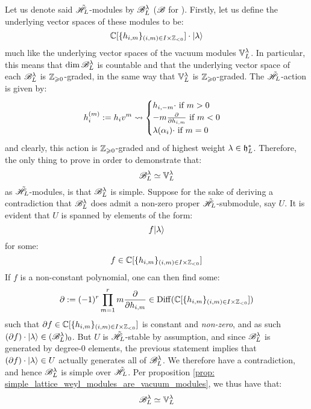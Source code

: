 \begin{example}
            Let us denote said $\tilde{\mathscr{H}}_L$-modules by $\mathscr{B}_L^{\lambda}$ ($\mathscr{B}$ for ). Firstly, let us define the underlying vector spaces of these modules to be:
                $$\bbC[ \{h_{i, m}\}_{(i, m) \in I \x \Z_{< 0}} ] \cdot \ket{\lambda}$$
            much like the underlying vector spaces of the vacuum modules $\mathbb{V}_L^{\lambda}$. In particular, this means that $\dim \mathscr{B}_L^{\lambda}$ is countable and that the underlying vector space of each $\mathscr{B}_L^{\lambda}$ is $\mathbb{Z}_{\geqslant 0}$-graded, in the same way that $\mathbb{V}_L^{\lambda}$ is $\mathbb{Z}_{\geqslant 0}$-graded. The $\tilde{\mathscr{H}}_L$-action is given by:
                $$
                    h_i^{(m)} := h_i v^m \leadsto
                    \begin{cases}
                        \text{$h_{i, -m} \cdot$ if $m > 0$}
                        \\
                        \text{$-m \frac{\partial}{\partial h_{i, m}}$ if $m < 0$}
                        \\
                        \text{$\lambda(\alpha_i) \cdot$ if $m = 0$}
                    \end{cases}
                $$
            and clearly, this action is $\mathbb{Z}_{\geqslant 0}$-graded and of highest weight $\lambda \in \mathfrak{h}_L^*$. Therefore, the only thing to prove in order to demonstrate that:
                $$\mathscr{B}_L^{\lambda} \simeq \mathbb{V}_L^{\lambda}$$
            as $\tilde{\mathscr{H}}_L$-modules, is that $\mathscr{B}_L^{\lambda}$ is simple. Suppose for the sake of deriving a contradiction that $\mathscr{B}_L^{\lambda}$ does admit a non-zero proper $\tilde{\mathscr{H}}_L$-submodule, say $U$. It is evident that $U$ is spanned by elements of the form:
                $$f \lvert {\lambda} \rangle$$
            for some:
                $$f \in \bbC[ \{h_{i, m}\}_{(i, m) \in I \x \Z_{< 0}} ]$$
            If $f$ is a non-constant polynomial, one can then find some:
                $$\del := (-1)^r \prod_{m = 1}^r m \frac{\del}{\del h_{i, m}} \in \Diff(\bbC[ \{h_{i, m}\}_{(i, m) \in I \x \Z_{< 0}} ])$$
            such that $\del f \in \bbC[ \{h_{i, m}\}_{(i, m) \in I \x \Z_{< 0}} ]$ is constant and \textit{non-zero}, and as such $(\partial f) \cdot \lvert {\lambda} \rangle \in (\mathscr{B}_L^{\lambda})_0$. But $U$ is $\tilde{\mathscr{H}}_L$-stable by assumption, and since $\mathscr{B}_L^{\lambda}$ is generated by degree-$0$ elements, the previous statement implies that $(\partial f) \cdot \lvert {\lambda} \rangle \in U$ actually generates all of $\mathscr{B}_L^{\lambda}$. We therefore have a contradiction, and hence $\mathscr{B}_L^{\lambda}$ is simple over $\tilde{\mathscr{H}}_L$. Per proposition \ref{prop: simple_lattice_weyl_modules_are_vacuum_modules}, we thus have that:
                $$\mathscr{B}_L^{\lambda} \simeq \mathbb{V}_L^{\lambda}$$
        \end{example}

